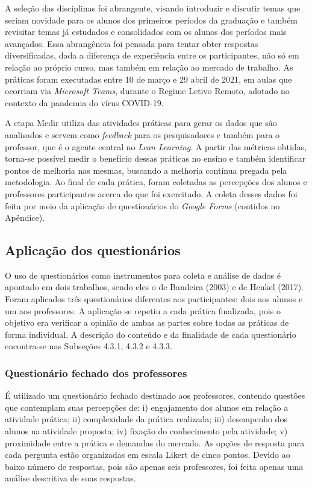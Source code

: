 A seleção das disciplinas foi abrangente, visando introduzir e discutir temas que seriam novidade para os alunos dos primeiros períodos da graduação e também revisitar temas já estudados e consolidados com os alunos dos períodos mais avançados. Essa abrangência foi pensada para tentar obter respostas diversificadas, dada a diferença de experiência entre os participantes, não só em relação ao próprio curso, mas também em relação ao mercado de trabalho. As práticas foram executadas entre 10 de março e 29 abril de 2021, em aulas que ocorriam via \textit{Microsoft Teams}, durante o Regime Letivo Remoto, adotado no contexto da pandemia do vírus COVID-19. 

A etapa Medir utiliza das atividades práticas para gerar os dados que são analisados e servem como \textit{feedback} para os pesquisadores e também para o professor, que é o agente central no \textit{Lean Learning}. A partir das métricas obtidas, torna-se possível medir o benefício dessas práticas no ensino e também identificar pontos de melhoria nas mesmas, buscando a melhoria contínua pregada pela metodologia. Ao final de cada prática, foram coletadas as percepções dos alunos e professores participantes acerca do que foi exercitado. A coleta desses dados foi feita por meio da aplicação de questionários do \textit{Google Forms} (contidos no Apêndice).

\subsection{Aplicação dos questionários}

O uso de questionários como instrumentos para coleta e análise de dados é apontado em dois trabalhos, sendo eles o de Bandeira (2003)\nocite{Questionarios1} e de Henkel (2017)\nocite{Questionarios2}. Foram aplicados três questionários diferentes aos participantes: dois aos alunos e um aos professores. A aplicação se repetiu a cada prática finalizada, pois o objetivo era verificar a opinião de ambas as partes sobre todas as práticas de forma individual. A descrição do conteúdo e da finalidade de cada questionário encontra-se nas Subseções 4.3.1, 4.3.2 e 4.3.3.

\subsubsection{Questionário fechado dos professores}

É utilizado um questionário fechado destinado aos professores, contendo questões que contemplam suas percepções de: i) engajamento dos alunos em relação a atividade prática; ii) complexidade da prática realizada; iii) desempenho dos alunos na atividade proposta; iv) fixação do conhecimento pela atividade; v) proximidade entre a prática e demandas do mercado. As opções de resposta para cada pergunta estão organizadas em escala Likert de cinco pontos. Devido ao baixo número de respostas, pois são apenas seis professores, foi feita apenas uma análise descritiva de suas respostas.

